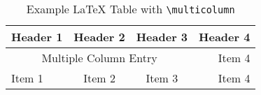 \begin{table}[H]
   \caption{Example LaTeX Table with \texttt{\textbackslash multicolumn}} 
   \label{tab:TabEx}
   \small %
   \centering %
   \begin{tabular}{lccr} %
   \toprule[\heavyrulewidth]\toprule[\heavyrulewidth]
   \textbf{Header 1} & \textbf{Header 2} & \textbf{Header 3} & \textbf{Header 4} \\ 
   \midrule
   \multicolumn{3}{c}{Multiple Column Entry} & Item 4 \\
   Item 1 & Item 2 & Item 3 & Item 4\\
   \bottomrule[\heavyrulewidth] 
   \end{tabular}
\end{table}